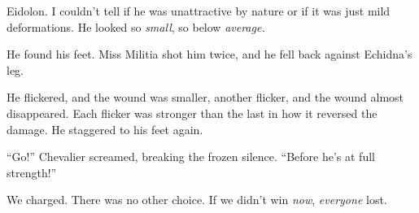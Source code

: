 Eidolon.  I couldn't tell if he was unattractive by nature or if it was just mild deformations.  He looked so \emph{small}, so below \emph{average.}



He found his feet.  Miss Militia shot him twice, and he fell back against Echidna's leg.



He flickered, and the wound was smaller, another flicker, and the wound almost disappeared.  Each flicker was stronger than the last in how it reversed the damage.  He staggered to his feet again.



``Go!'' Chevalier screamed, breaking the frozen silence.  ``Before he's at full strength!''



We charged.  There was no other choice.  If we didn't win \emph{now}, \emph{everyone} lost.





